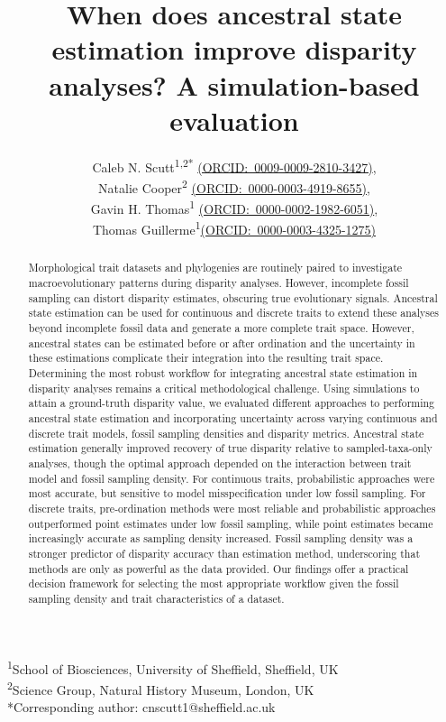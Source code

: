 \documentclass[11pt, a4paper]{article}
\title{When does ancestral state estimation improve disparity analyses? A simulation-based evaluation}
\author{
  Caleb N. Scutt\textsuperscript{1,2*} \href{https://orcid.org/0009-0009-2810-3427}
       {(\mbox{ORCID: 0009-0009-2810-3427})},\\
  Natalie Cooper\textsuperscript{2} \href{https://orcid.org/0000-0003-4919-8655}
       {(\mbox{ORCID: 0000-0003-4919-8655})},\\
  Gavin H. Thomas\textsuperscript{1}
  \href{https://orcid.org/0000-0002-1982-6051}
       {(\mbox{ORCID: 0000-0002-1982-6051})}, \\
  Thomas Guillerme\textsuperscript{1}\href{https://orcid.org/0000-0003-4325-1275}
       {(\mbox{ORCID: 0000-0003-4325-1275})}
}
\date{}
\begin{document}
\maketitle

\begin{center}
\small
\textsuperscript{1}School of Biosciences, University of Sheffield, Sheffield, UK\\
\textsuperscript{2}Science Group, Natural History Museum, London, UK\\[12pt]
*Corresponding author: cnscutt1@sheffield.ac.uk 
\end{center}


\begin{abstract}
\noindent
Morphological trait datasets and phylogenies are routinely paired to investigate macroevolutionary patterns during disparity analyses.
However, incomplete fossil sampling can distort disparity estimates, obscuring true evolutionary signals.
Ancestral state estimation can be used for continuous and discrete traits to extend these analyses beyond incomplete fossil data and generate a more complete trait space.
However, ancestral states can be estimated before or after ordination and the uncertainty in these estimations complicate their integration into the resulting trait space.
Determining the most robust workflow for integrating ancestral state estimation in disparity analyses remains a critical methodological challenge.
Using simulations to attain a ground-truth disparity value, we evaluated different approaches to performing ancestral state estimation and incorporating uncertainty across varying continuous and discrete trait models, fossil sampling densities and disparity metrics.
Ancestral state estimation generally improved recovery of true disparity relative to sampled-taxa-only analyses, though the optimal approach depended on the interaction between trait model and fossil sampling density.
For continuous traits, probabilistic approaches were most accurate, but sensitive to model misspecification under low fossil sampling.
For discrete traits, pre-ordination methods were most reliable and probabilistic approaches outperformed point estimates under low fossil sampling, while point estimates became increasingly accurate as sampling density increased.
Fossil sampling density was a stronger predictor of disparity accuracy than estimation method, underscoring that methods are only as powerful as the data provided.
Our findings offer a practical decision framework for selecting the most appropriate workflow given the fossil sampling density and trait characteristics of a dataset.

\end{abstract}
\end{document}
